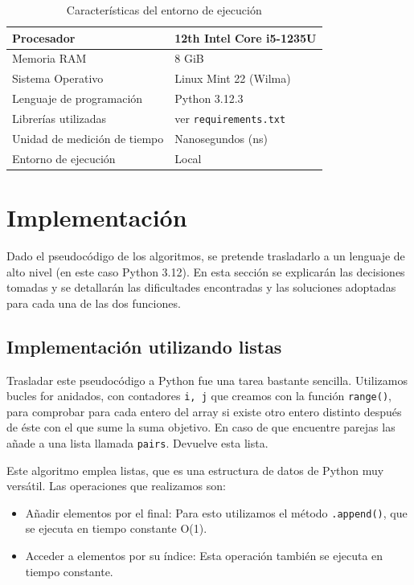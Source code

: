 \documentclass[a4paper, titlepage]{article}
\begin{document}
\begin{table}
\centering
\begin{tabular}{|l|l|}
\hline
Procesador &  12th Intel Core i5-1235U\\  \hline
Memoria RAM &  8 GiB\\  \hline
Sistema Operativo& Linux Mint 22 (Wilma) \\ \hline
Lenguaje de programación & Python 3.12.3\\ \hline
Librerías utilizadas & ver \texttt{requirements.txt}\\ \hline 
Unidad de medición de tiempo & Nanosegundos (ns)\\ \hline
Entorno de ejecución & Local \\\hline
\end{tabular}
\caption{Características del entorno de ejecución}
\label{maquina}
\end{table}

\section{Implementación}

Dado el pseudocódigo de los algoritmos, se pretende trasladarlo a un lenguaje de alto nivel (en este caso Python 3.12). En esta sección se explicarán las decisiones tomadas y se detallarán las dificultades encontradas y las soluciones adoptadas para cada una de las dos funciones.

\subsection{Implementación utilizando listas}

Trasladar este pseudocódigo a Python fue una tarea bastante sencilla. Utilizamos bucles for anidados, con contadores \texttt{i, j} que creamos con la función \texttt{range()}, para comprobar para cada entero del array si existe otro entero distinto después de éste con el que sume la suma objetivo. En caso de que encuentre parejas las añade a una lista llamada  \texttt{pairs}. Devuelve esta lista.

Este algoritmo emplea listas, que es una estructura de datos de Python muy versátil. Las operaciones que realizamos son:

\begin{itemize}

\item{Añadir elementos por el final: Para esto utilizamos el método \texttt{.append()}, que se ejecuta en tiempo constante O(1).}
\item{Acceder a elementos por su índice: Esta operación también se ejecuta en tiempo constante.}

\end{itemize}
\end{document}
